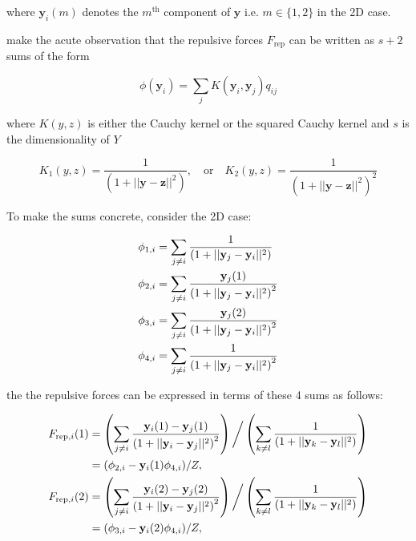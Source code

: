 \documentclass[11pt]{article}
\begin{document}
where $\mathbf{y}_i(m)$ denotes the $m^{\text{th}}$ component of $\mathbf{y}$ i.e. $m \in \{1, 2\}$ in the 2D case.

\cite{linderman2017efficient} make the acute observation that the repulsive forces $F_\text{rep}$ can be written as $s + 2$ sums of the form

\begin{equation}
\phi(\mathbf{y}_i) = \sum_j K (\mathbf{y}_i, \mathbf{y}_j) q_{ij}
\end{equation}

where $K(y, z)$ is either the Cauchy kernel or the squared Cauchy kernel and $s$ is the dimensionality of $Y$

\begin{equation}
K_1(y, z) = \frac{1}{\left( 1 + || \mathbf{y} - \mathbf{z} ||^2 \right)}, \quad\text{or}\quad K_2(y, z) = \frac{1}{ \left( 1 + || \mathbf{y} - \mathbf{z} ||^2 \right) ^2}
\end{equation}

To make the sums concrete, consider the 2D case:

\begin{align}
\phi_{1, i} &= \sum_{j \neq i} \frac{1}{\left( 1 + || \mathbf{y}_j - \mathbf{y}_i ||^2 \right)} \notag \\
\phi_{2, i} &= \sum_{j \neq i} \frac{\mathbf{y}_j(1)}{\left( 1 + || \mathbf{y}_j - \mathbf{y}_i ||^2 \right)^2} \notag \\
\phi_{3, i} &= \sum_{j \neq i} \frac{\mathbf{y}_j(2)}{\left( 1 + || \mathbf{y}_j - \mathbf{y}_i ||^2 \right)^2} \notag \\
\phi_{4, i} &= \sum_{j \neq i} \frac{1}{\left( 1 + || \mathbf{y}_j - \mathbf{y}_i ||^2 \right)^2} \notag
\end{align}

the the repulsive forces can be expressed in terms of these 4 sums as follows:

\begin{align}
F_{\text{rep}, i}(1) &= \left ( \sum_{j \neq i} \frac{\mathbf{y}_i(1) - \mathbf{y}_j(1)}{\left ( 1 + || \mathbf{y}_i - \mathbf{y}_j ||^2 \right )^{2}} \right )
\bigg/
\left( \sum_{k \neq l} \frac{1}{\left ( 1 + || \mathbf{y}_k - \mathbf{y}_l ||^2 \right )} \right) \notag \\
&= (\phi_{2, i} - \mathbf{y}_{i}(1)\phi_{4, i}) / Z, \\
F_{\text{rep}, i}(2) &= \left ( \sum_{j \neq i} \frac{\mathbf{y}_i(2) - \mathbf{y}_j(2)}{\left ( 1 + || \mathbf{y}_i - \mathbf{y}_j ||^2 \right )^{2}} \right )
\bigg/
\left( \sum_{k \neq l} \frac{1}{\left ( 1 + || \mathbf{y}_k - \mathbf{y}_l ||^2 \right )} \right) \notag \\
&= (\phi_{3, i} - \mathbf{y}_{i}(2)\phi_{4, i}) / Z,
\end{align}
\end{document}
